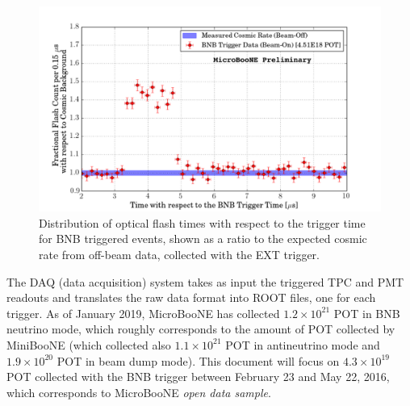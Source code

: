 \begin{figure}[htbp]
    \centering
    \includegraphics[width=0.85\linewidth]{figures/trigger.pdf}
    \caption{Distribution of optical flash times with respect to the trigger time for BNB triggered events, shown as a ratio to the expected cosmic rate from off-beam data, collected with the EXT trigger.}
    \label{fig:trigger}
\end{figure}

The DAQ (data acquisition) system takes as input the triggered TPC and PMT readouts and translates the raw data format into ROOT files, one for each trigger. As of January 2019, MicroBooNE has collected $1.2\times10^{21}$ POT in BNB neutrino mode, which roughly corresponds to the amount of POT collected by MiniBooNE (which collected also $1.1\times10^{21}$ POT in antineutrino mode and $1.9\times10^{20}$ POT in beam dump mode).
This document will focus on $4.3\times10^{19}$ POT collected with the BNB trigger between February 23 and May 22, 2016, which corresponds to MicroBooNE \emph{open data sample}. 